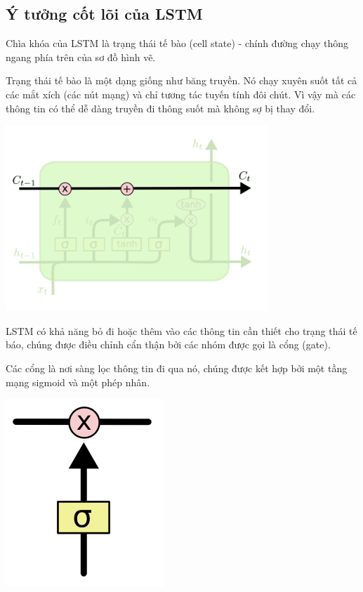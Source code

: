 \subsection{Ý tưởng cốt lõi của LSTM}
Chìa khóa của LSTM là trạng thái tế bào (cell state) - chính đường chạy thông ngang phía trên của sơ đồ hình vẽ.\par
Trạng thái tế bào là một dạng giống như băng truyền. Nó chạy xuyên suốt tất cả các mắt xích (các nút mạng) và chỉ tương tác tuyến tính đôi chút. Vì vậy mà các thông tin có thể dễ dàng truyền đi thông suốt mà không sợ bị thay đổi.
\begin{center}
    \includegraphics[scale=.5]{image/chapter6/yn1.png}
    \begin{figure}[htp]
    \begin{center}
     
    \end{center}
    \end{figure}
\end{center}
LSTM có khả năng bỏ đi hoặc thêm vào các thông tin cần thiết cho trạng thái tế báo, chúng được điều chỉnh cẩn thận bởi các nhóm được gọi là cổng (gate).\par
Các cổng là nơi sàng lọc thông tin đi qua nó, chúng được kết hợp bởi một tầng mạng sigmoid và một phép nhân.
\begin{center}
    \includegraphics[scale=.3]{image/chapter6/yn2.png}
    \begin{figure}[htp]
    \begin{center}
     
    \end{center}
    \end{figure}
\end{center}
